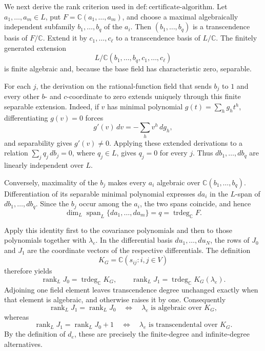 We next derive the rank criterion used in \(\mathrm{def:certificate\mbox{-}algorithm}\).  Let \(a_1,\ldots,a_m\in L\), put \(F=\mathbb C(a_1,\ldots,a_m)\), and choose a maximal algebraically independent subfamily \(b_1,\ldots,b_q\) of the \(a_i\).  Then \((b_1,\ldots,b_q)\) is a transcendence basis of \(F/\mathbb C\).  Extend it by \(c_1,\ldots,c_\ell\) to a transcendence basis of \(L/\mathbb C\).  The finitely generated extension
\[
L/\mathbb C(b_1,\ldots,b_q,c_1,\ldots,c_\ell)
\]
is finite algebraic and, because the base field has characteristic zero, separable.

For each \(j\), the derivation on the rational-function field that sends \(b_j\) to \(1\) and every other \(b\)- and \(c\)-coordinate to zero extends uniquely through this finite separable extension.  Indeed, if \(v\) has minimal polynomial \(g(t)=\sum_h g_h t^h\), differentiating \(g(v)=0\) forces
\[
g'(v)\,dv=-\sum_h v^h\,dg_h,
\]
and separability gives \(g'(v)\ne0\).  Applying these extended derivations to a relation \(\sum_j q_j\,db_j=0\), where \(q_j\in L\), gives \(q_j=0\) for every \(j\).  Thus \(db_1,\ldots,db_q\) are linearly independent over \(L\).

Conversely, maximality of the \(b_j\) makes every \(a_i\) algebraic over \(\mathbb C(b_1,\ldots,b_q)\).  Differentiation of its separable minimal polynomial expresses \(da_i\) in the \(L\)-span of \(db_1,\ldots,db_q\).  Since the \(b_j\) occur among the \(a_i\), the two spans coincide, and hence
\[
\dim_L\operatorname{span}_L\{da_1,\ldots,da_m\}
=q
=\operatorname{trdeg}_{\mathbb C}F.
\]

Apply this identity first to the covariance polynomials and then to those polynomials together with \(\lambda_e\).  In the differential basis \(du_1,\ldots,du_N\), the rows of \(J_0\) and \(J_1\) are the coordinate vectors of the respective differentials.  The definition
\[
K_G=\mathbb C(s_{ij}:i,j\in V)
\]
therefore yields
\[
\operatorname{rank}_L J_0=\operatorname{trdeg}_{\mathbb C}K_G,
\qquad
\operatorname{rank}_L J_1
=\operatorname{trdeg}_{\mathbb C}K_G(\lambda_e).
\]
Adjoining one field element leaves transcendence degree unchanged exactly when that element is algebraic, and otherwise raises it by one.  Consequently
\[
\operatorname{rank}_L J_1=\operatorname{rank}_L J_0
\quad\Longleftrightarrow\quad
\lambda_e\text{ is algebraic over }K_G,
\]
whereas
\[
\operatorname{rank}_L J_1=\operatorname{rank}_L J_0+1
\quad\Longleftrightarrow\quad
\lambda_e\text{ is transcendental over }K_G.
\]
By the definition of \(d_e\), these are precisely the finite-degree and infinite-degree alternatives.

